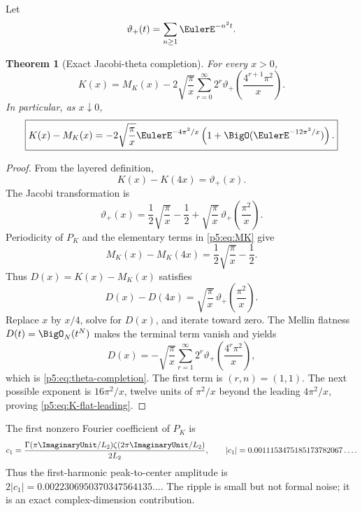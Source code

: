 \documentclass[11pt]{article}
\numberwithin{equation}{section}
\newtheorem{theorem}{Theorem}[section]
\theoremstyle{definition}
\theoremstyle{remark}
\begin{document}
Let
\begin{equation}\label{p5:eq:theta-plus}
 \vartheta_+(t)=\sum_{n\ge1}\EulerE^{-n^2t}.
\end{equation}

\begin{theorem}[Exact Jacobi-theta completion]\label{p5:thm:theta-completion}
For every $x>0$,
\begin{equation}\label{p5:eq:theta-completion}
 \boxed{
 K(x)=M_K(x)-2\sqrt{\frac\pi x}
 \sum_{r=0}^{\infty}2^r
 \vartheta_+\!\left(\frac{4^{r+1}\pi^2}{x}\right).}
\end{equation}
In particular, as $x\downarrow0$,
\begin{equation}\label{p5:eq:K-flat-leading}
 \boxed{
 K(x)-M_K(x)=
 -2\sqrt{\frac\pi x}\EulerE^{-4\pi^2/x}
 \left(1+\BigO(\EulerE^{-12\pi^2/x})\right).}
\end{equation}
\end{theorem}

\begin{proof}
From the layered definition,
\begin{equation}\label{p5:eq:K-difference}
 K(x)-K(4x)=\vartheta_+(x).
\end{equation}
The Jacobi transformation is
\begin{equation}\label{p5:eq:Jacobi-plus}
 \vartheta_+(x)=\frac12\sqrt{\frac\pi x}-\frac12
 +\sqrt{\frac\pi x}\,\vartheta_+\!\left(\frac{\pi^2}{x}\right).
\end{equation}
Periodicity of $P_K$ and the elementary terms in \cref{p5:eq:MK} give
\begin{equation}\label{p5:eq:MK-difference}
 M_K(x)-M_K(4x)=\frac12\sqrt{\frac\pi x}-\frac12.
\end{equation}
Thus $D(x)=K(x)-M_K(x)$ satisfies
\begin{equation}\label{p5:eq:D-difference}
 D(x)-D(4x)=\sqrt{\frac\pi x}\,
 \vartheta_+\!\left(\frac{\pi^2}{x}\right).
\end{equation}
Replace $x$ by $x/4$, solve for $D(x)$, and iterate toward zero.  The Mellin
flatness $D(t)=\BigO_N(t^N)$ makes the terminal term vanish and yields
\[
 D(x)=-\sqrt{\frac\pi x}
 \sum_{r=1}^{\infty}2^r
 \vartheta_+\!\left(\frac{4^r\pi^2}{x}\right),
\]
which is \cref{p5:eq:theta-completion}.  The first term is $(r,n)=(1,1)$.
The next possible exponent is $16\pi^2/x$, twelve units of $\pi^2/x$ beyond
the leading $4\pi^2/x$, proving \cref{p5:eq:K-flat-leading}.
\end{proof}

\begin{remark}
The first nonzero Fourier coefficient of $P_K$ is
\[
 c_1=\frac{\Gamma(\pi\ImaginaryUnit/L_2)\zeta(2\pi\ImaginaryUnit/L_2)}{2L_2},
 \qquad |c_1|=0.0011153475185173782067\ldots.
\]
Thus the first-harmonic peak-to-center amplitude is
$2|c_1|=0.0022306950370347564135\ldots$.  The ripple is small but not
formal noise; it is an exact complex-dimension contribution.
\end{remark}
\end{document}
